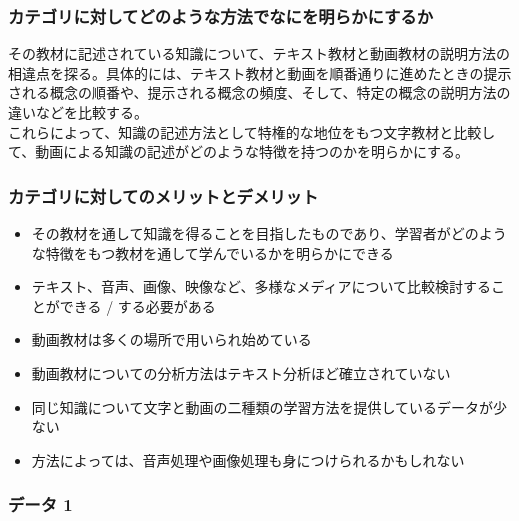 \hypertarget{ux30abux30c6ux30b4ux30eaux306bux5bfeux3057ux3066ux3069ux306eux3088ux3046ux306aux65b9ux6cd5ux3067ux306aux306bux3092ux660eux3089ux304bux306bux3059ux308bux304b-4}{%
\subsubsection{カテゴリに対してどのような方法でなにを明らかにするか}\label{ux30abux30c6ux30b4ux30eaux306bux5bfeux3057ux3066ux3069ux306eux3088ux3046ux306aux65b9ux6cd5ux3067ux306aux306bux3092ux660eux3089ux304bux306bux3059ux308bux304b-4}}

その教材に記述されている知識について、テキスト教材と動画教材の説明方法の相違点を探る。具体的には、テキスト教材と動画を順番通りに進めたときの提示される概念の順番や、提示される概念の頻度、そして、特定の概念の説明方法の違いなどを比較する。\\
これらによって、知識の記述方法として特権的な地位をもつ文字教材と比較して、動画による知識の記述がどのような特徴を持つのかを明らかにする。

\hypertarget{ux30abux30c6ux30b4ux30eaux306bux5bfeux3057ux3066ux306eux30e1ux30eaux30c3ux30c8ux3068ux30c7ux30e1ux30eaux30c3ux30c8-4}{%
\subsubsection{カテゴリに対してのメリットとデメリット}\label{ux30abux30c6ux30b4ux30eaux306bux5bfeux3057ux3066ux306eux30e1ux30eaux30c3ux30c8ux3068ux30c7ux30e1ux30eaux30c3ux30c8-4}}

\begin{itemize}
\tightlist
\item
  その教材を通して知識を得ることを目指したものであり、学習者がどのような特徴をもつ教材を通して学んでいるかを明らかにできる
\item
  テキスト、音声、画像、映像など、多様なメディアについて比較検討することができる
  / する必要がある
\item
  動画教材は多くの場所で用いられ始めている
\item
  動画教材についての分析方法はテキスト分析ほど確立されていない
\item
  同じ知識について文字と動画の二種類の学習方法を提供しているデータが少ない
\item
  方法によっては、音声処理や画像処理も身につけられるかもしれない
\end{itemize}

\hypertarget{ux30c7ux30fcux30bf-1-4}{%
\subsubsection{データ 1}\label{ux30c7ux30fcux30bf-1-4}}


